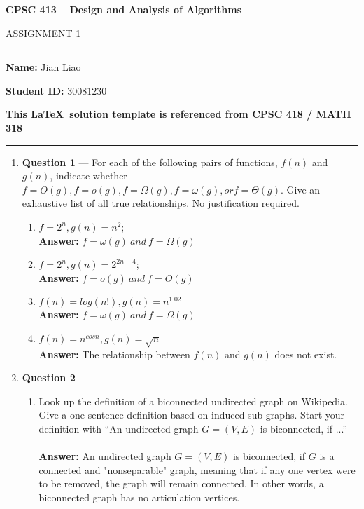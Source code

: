 \documentclass[11pt]{article}
\theoremstyle{definition}
\begin{document}
\begin{center}
{\bf \Large CPSC 413 -- Design and Analysis of Algorithms \uppercase\expandafter{}

ASSIGNMENT 1}
\end{center}

\hrule 	

\textbf{Name:} Jian Liao

\textbf{Student ID:} 30081230

\textbf{This \LaTeX \ solution template is referenced from CPSC 418 / MATH 318}

\medskip \hrule

\begin{enumerate}

\item[] \textbf{Question 1} ---  For each of the following pairs of functions, $f(n)$ and $g(n)$, indicate whether $f=O(g), f=o(g), f=\Omega(g), f=\omega(g), or f=\Theta(g)$. Give an exhaustive list of all true relationships. No justification required.

\begin{enumerate}
\item %
$f=2^n, g(n)=n^2$; \\
\textbf{Answer:} $f=\omega(g) \ and\ f=\Omega(g)$ \\

\item %
$f=2^n, g(n)=2^{2n-4}$; \\
\textbf{Answer:} $f=o(g) \ and\ f=O(g)$ \\		


\item %
$f(n)=log(n!), g(n)=n^{1.02}$ \\
\textbf{Answer:} $f=\omega(g) \ and\ f=\Omega(g)$ \\

\item %
$f(n)=n^{cos n}, g(n)=\sqrt{n}$ \\
\textbf{Answer:} The relationship between $f(n)$ and $g(n)$ does not exist. \\

\end{enumerate}

\newpage

\item[] \textbf{Question 2}

\begin{enumerate}

\item %
Look up the definition of a biconnected undirected graph on Wikipedia. Give a one sentence definition based on induced sub-graphs. Start your definition with “An undirected graph $G=(V, E)$ is biconnected, if ...” \\
\\
\textbf{Answer:} An undirected graph $G=(V, E)$ is biconnected, if $G$ is a connected and "nonseparable" graph, meaning that if any one vertex were to be removed, the graph will remain connected. In other words, a biconnected graph has no articulation vertices.


\end{enumerate}
\end{enumerate}
\end{document}
